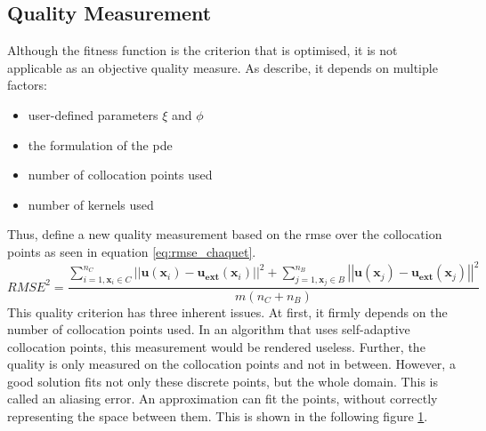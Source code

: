 \documentclass[./\jobname.tex]{subfiles}
\begin{document}
\subsection{Quality Measurement}
\label{chap:metric_quality}
Although the fitness function is the criterion that is optimised, it is not applicable as an objective quality measure. As \cite{chaquet_using_2019} describe, it depends on multiple factors:
\begin{itemize}
	\item user-defined parameters $\xi$ and $\phi$ 
	\item the formulation of the \gls{pde} 
	\item number of collocation points used 
	\item number of kernels used
\end{itemize}
Thus, \cite{chaquet_using_2019} define a new quality measurement based on the \gls{rmse} over the collocation points as seen in equation \ref{eq:rmse_chaquet}. 
\begin{equation}
\label{eq:rmse_chaquet}
RMSE^2 = \frac{\sum_{i=1, \mathbf{x}_i \in C}^{n_C} \left|\left| \mathbf{u}(\mathbf{x}_i) - \mathbf{u_{ext}}(\mathbf{x}_i) \right|\right|^2 + \sum_{j=1, \mathbf{x}_j \in B}^{n_B} \left|\left| \mathbf{u}(\mathbf{x}_j) - \mathbf{u_{ext}}(\mathbf{x}_j) \right|\right|^2}{m(n_C + n_B)}
\end{equation}
This quality criterion has three inherent issues. At first, it firmly depends on the number of collocation points used. In an algorithm that uses self-adaptive collocation points, this measurement would be rendered useless. Further, the quality is only measured on the collocation points and not in between. However, a good solution fits not only these discrete points, but the whole domain. This is called an aliasing error. An approximation can fit the points, without correctly representing the space between them. This is shown in the following figure \ref{fig:aliasing error}.

\begin{figure}[H]
	\centering
	\noindent{}
	\label{fig:aliasing error}
\end{figure}
\end{document}
